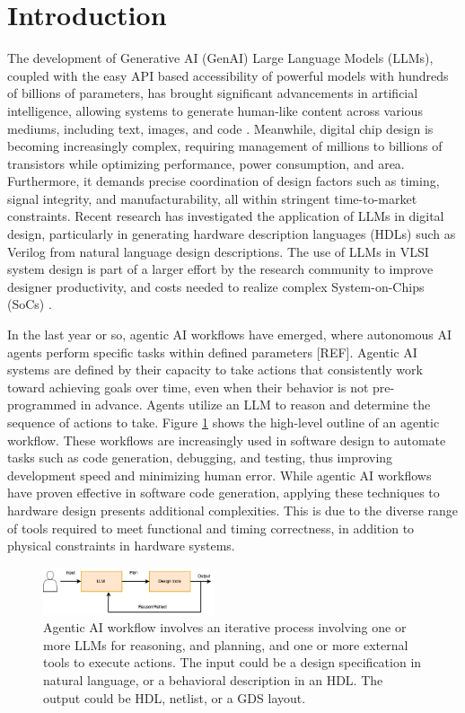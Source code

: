 \section{Introduction}
\label{sec:introduction}

The development of Generative AI (GenAI) Large Language Models (LLMs), coupled with the easy API based accessibility of powerful models with hundreds of billions of parameters,  has brought significant advancements in artificial intelligence, allowing systems to generate human-like content across various mediums, including text, images, and code \cite{intro2LLM}. Meanwhile, digital chip design is becoming increasingly complex, requiring management of millions to billions of transistors while optimizing performance, power consumption, and area. Furthermore, it demands precise coordination of design factors such as timing, signal integrity, and manufacturability, all within stringent time-to-market constraints. Recent research has investigated the application of LLMs in digital design, particularly in generating hardware description languages (HDLs) such as Verilog from natural language design descriptions. The use of LLMs in VLSI system design is part of a larger effort by the research community to improve designer productivity, and costs needed to realize complex System-on-Chips (SoCs) \cite{ajayi2019openroad}.

In the last year or so, agentic AI workflows have emerged, where autonomous AI agents perform specific tasks within defined parameters [REF]. Agentic AI systems are defined by their capacity to take actions that consistently work toward achieving goals over time, even when their behavior is not pre-programmed in advance. Agents utilize an LLM to reason and determine the sequence of actions to take. Figure \ref{fig:agentic_overview} shows the high-level outline of an agentic workflow.  These workflows are increasingly used in software design to automate tasks such as code generation, debugging, and testing, thus improving development speed and minimizing human error. While agentic AI workflows have proven effective in software code generation, applying these techniques to hardware design presents additional complexities. This is due to the diverse range of tools required to meet functional and timing correctness, in addition to physical constraints in hardware systems.


\begin{figure}[htbp]
	\includegraphics[width=0.45\textwidth]{figs/agentic_overview.png}
	\caption{Agentic AI workflow involves an iterative process involving one or more LLMs for reasoning, and planning, and one or more external tools to execute actions. The input could be a design specification in natural language, or a behavioral description in an HDL. The output could be HDL, netlist, or a GDS layout.
}
	\label{fig:agentic_overview}
\end{figure}

